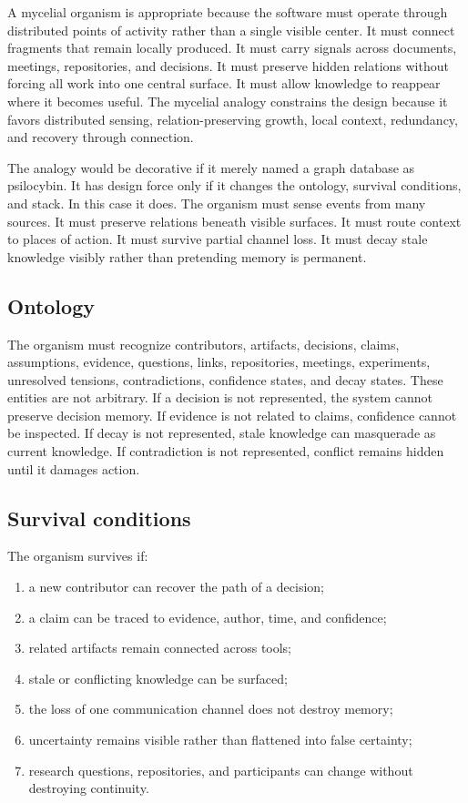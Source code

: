 \documentclass[11pt]{article}
\begin{document}
A mycelial organism is appropriate because the software must operate through distributed points of activity rather than a single visible center. It must connect fragments that remain locally produced. It must carry signals across documents, meetings, repositories, and decisions. It must preserve hidden relations without forcing all work into one central surface. It must allow knowledge to reappear where it becomes useful. The mycelial analogy constrains the design because it favors distributed sensing, relation-preserving growth, local context, redundancy, and recovery through connection.

The analogy would be decorative if it merely named a graph database as psilocybin. It has design force only if it changes the ontology, survival conditions, and stack. In this case it does. The organism must sense events from many sources. It must preserve relations beneath visible surfaces. It must route context to places of action. It must survive partial channel loss. It must decay stale knowledge visibly rather than pretending memory is permanent.

\subsection{Ontology}

The organism must recognize contributors, artifacts, decisions, claims, assumptions, evidence, questions, links, repositories, meetings, experiments, unresolved tensions, contradictions, confidence states, and decay states. These entities are not arbitrary. If a decision is not represented, the system cannot preserve decision memory. If evidence is not related to claims, confidence cannot be inspected. If decay is not represented, stale knowledge can masquerade as current knowledge. If contradiction is not represented, conflict remains hidden until it damages action.

\subsection{Survival conditions}

The organism survives if:

\begin{enumerate}[leftmargin=*]
    \item a new contributor can recover the path of a decision;
    \item a claim can be traced to evidence, author, time, and confidence;
    \item related artifacts remain connected across tools;
    \item stale or conflicting knowledge can be surfaced;
    \item the loss of one communication channel does not destroy memory;
    \item uncertainty remains visible rather than flattened into false certainty;
    \item research questions, repositories, and participants can change without destroying continuity.
\end{enumerate}
\end{document}
